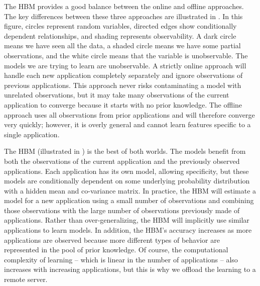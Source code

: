 The HBM provides a good balance between the online and offline
approaches.  The key differences between these three approaches are
illustrated in . In this figure, circles
represent random variables, directed edges show conditionally
dependent relationships, and shading represents observability.  A dark
circle means we have seen all the data, a shaded circle means we have
some partial observations, and the white circle means that the
variable is unobservable.  The models we are trying to learn
are unobservable.  A strictly online approach will handle each new
application completely separately and ignore observations of previous
applications.  This approach never risks contaminating a model with
unrelated observations, but it may take many observations of the
current application to converge because it starts with no prior
knowledge. The offline approach uses all observations from prior
applications and will therefore converge very quickly; however, it is
overly general and cannot learn features specific to a single
application.

The HBM (illustrated in ) is the best of both worlds. The
models benefit from both the observations of the current application
and the previously observed applications.  Each application has its own
model, allowing specificity, but these models are conditionally
dependent on some underlying probability distribution with a hidden
mean and co-variance matrix.  In practice, the HBM will estimate a
model for a new application using a small number of observations and
combining those observations with the large number of observations
previously made of applications.  Rather than over-generalizing, the
HBM will implicitly use similar applications to learn models.  In
addition, the HBM's accuracy increases as more applications are
observed because more different types of behavior are represented in
the pool of prior knowledge.  Of course, the computational complexity
of learning -- which is linear in the number of applications -- also
increases with increasing applications, but this is why we offload the
learning to a remote server.

